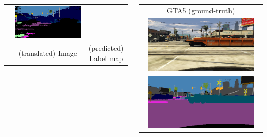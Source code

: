 \documentclass{beamer}
\begin{document}
\begin{frame}
\begin{columns}[c]
\begin{table}
{\begin{tabular}{cc||c}
\begin{minipage}[c]{\textwidth}
				\end{minipage} & 
				\begin{minipage}[c]{\textwidth}
					\includegraphics[width=\textwidth]{../images/evaluation/SG-GAN_pred_labels_train.png}
				\end{minipage} \\
				\multicolumn{1}{c}{} & \tiny (translated) Image & \tiny (predicted) Label map
		\end{tabular}}
	\end{table}
	\begin{table}
		\begin{tabular}{c}
			GTA5 (ground-truth) \\
			\includegraphics[width=0.9\textwidth]{../images/evaluation/GTA_gt_image_train.png}\\
			\includegraphics[width=0.9\textwidth]{../images/evaluation/GTA_gt_label_train.png}

\end{tabular}
\end{table}
\end{columns}
\end{frame}
\end{document}
